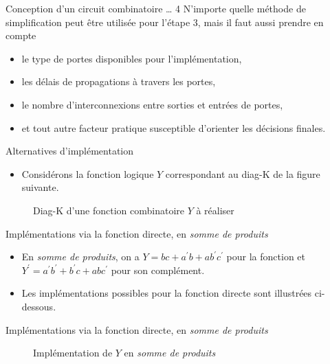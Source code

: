\documentclass[presentation]{beamer}
\begin{document}
\begin{frame}[label={sec:org00385db}]{Conception d'un circuit combinatoire \ldots{} 4}
N'importe quelle méthode de simplification peut être utilisée pour l'étape 3, mais il faut aussi prendre en compte 
\begin{itemize}
\item le type de portes disponibles pour l'implémentation,
\item les délais de propagations à travers les portes,
\item le nombre d'interconnexions entre sorties et entrées de portes,
\item et tout autre facteur pratique susceptible d'orienter les décisions finales.
\end{itemize}
\end{frame}

\begin{frame}[label={sec:org5fbec70}]{Alternatives d'implémentation}
\begin{itemize}
\item Considérons la fonction logique \(Y\) correspondant au diag-K de la figure suivante.
\end{itemize}

\begin{figure}[htbp]
\centering

\caption{\label{fig:orgde6aa46}Diag-K d'une fonction combinatoire \(Y\) à réaliser}
\end{figure} 
\end{frame}

\begin{frame}[label={sec:org865a669}]{Implémentations via la fonction directe, en \emph{somme de produits}}
\begin{itemize}
\item En \emph{somme de produits}, on a \(Y = bc + a^\prime b + a b^\prime c^\prime\) pour la fonction et \(Y^\prime = a^\prime b^\prime + b^\prime c + a b c^\prime\) pour son complément.

\item Les implémentations possibles pour la fonction directe sont illustrées ci-dessous.
\end{itemize}
\end{frame}

\begin{frame}[label={sec:org93672ac}]{Implémentations via la fonction directe, en \emph{somme de produits}}
\begin{figure}[htbp]
\centering

\caption{\label{fig:orgd7850b0}Implémentation de \(Y\) en \emph{somme de produits}}
\end{figure} 
\end{frame}
\end{document}

